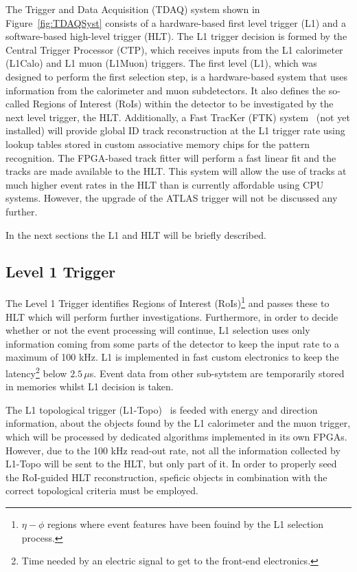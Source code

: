 		The Trigger and Data Acquisition (TDAQ) system shown in Figure~\ref{fig:TDAQSyst} consists of a hardware-based first level trigger (L1) and a software-based high-level trigger (HLT). The L1 trigger decision is formed by the Central Trigger Processor (CTP), which receives inputs from the L1 calorimeter (L1Calo) and L1 muon (L1Muon) triggers. The first level (L1), which was designed to perform the first selection step, is a hardware-based system that uses information from the calorimeter and muon subdetectors. It also defines the so-called Regions of Interest (RoIs) within the detector to be investigated by the next level trigger, the HLT. Additionally, a Fast TracKer (FTK) system~\cite{FTKTDR} (not yet installed) will provide global ID track reconstruction at the L1 trigger rate using lookup tables stored in custom associative memory chips for the pattern recognition. The FPGA-based track fitter will perform a fast linear fit and the tracks are made available to the HLT. This system will allow the use of tracks at much higher event rates in the HLT than is currently affordable using CPU systems. However, the upgrade of the ATLAS trigger will not be discussed any further.

		In the next sections the L1 and HLT will be briefly described. 


		\subsection{Level 1 Trigger}

			The Level 1 Trigger identifies Regions of Interest (RoIs)\footnote{$\eta - \phi$ regions where event features have been fouind by the L1 selection process.} and passes these to HLT which will perform further investigations. Furthermore, in order to decide whether or not the event processing will continue, L1 selection uses only information coming from some parts of the detector to keep the input rate to a maximum of 100 kHz. L1 is implemented in fast custom electronics to keep the latency\footnote{Time needed by an electric signal to get to the front-end electronics.} below $2.5\, \mu$s. Event data from other sub-sytstem are temporarily stored in memories whilst L1 decision is taken. 

			The L1 topological trigger (L1-Topo)~\cite{ATLASL1Topo} is feeded with energy and direction information, about the objects found by the L1 calorimeter and the muon trigger, which will be processed by dedicated algorithms implemented in its own FPGAs. However, due to the 100 kHz read-out rate, not all the information collected by L1-Topo will be sent to the HLT, but only part of it. In order to properly seed the RoI-guided HLT reconstruction, speficic objects in combination with the correct topological criteria must be employed.


